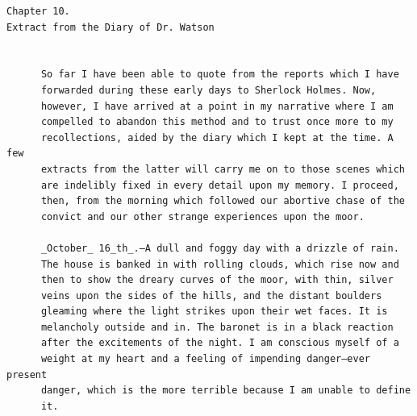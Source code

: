 \documentclass{article}
\begin{document}
\begin{verbatim}
Chapter 10.
Extract from the Diary of Dr. Watson


      So far I have been able to quote from the reports which I have
      forwarded during these early days to Sherlock Holmes. Now,
      however, I have arrived at a point in my narrative where I am
      compelled to abandon this method and to trust once more to my
      recollections, aided by the diary which I kept at the time. A few
      extracts from the latter will carry me on to those scenes which
      are indelibly fixed in every detail upon my memory. I proceed,
      then, from the morning which followed our abortive chase of the
      convict and our other strange experiences upon the moor.

      _October_ 16_th_.—A dull and foggy day with a drizzle of rain.
      The house is banked in with rolling clouds, which rise now and
      then to show the dreary curves of the moor, with thin, silver
      veins upon the sides of the hills, and the distant boulders
      gleaming where the light strikes upon their wet faces. It is
      melancholy outside and in. The baronet is in a black reaction
      after the excitements of the night. I am conscious myself of a
      weight at my heart and a feeling of impending danger—ever present
      danger, which is the more terrible because I am unable to define
      it.


\end{verbatim}
\end{document}
